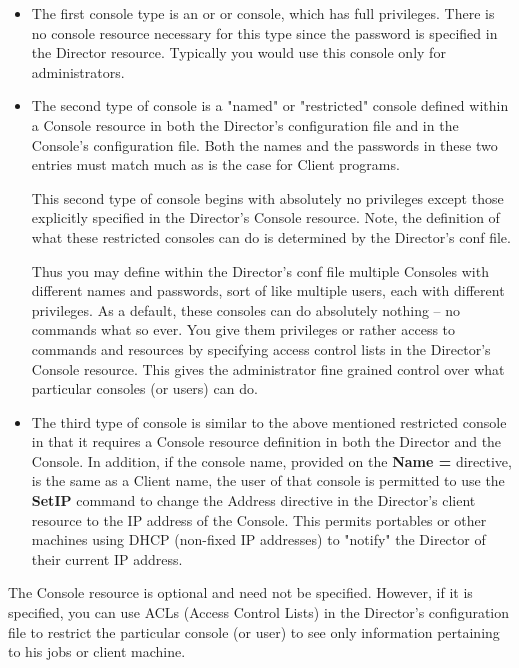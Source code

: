 \begin{itemize}
\item The first console type is an  or  or 
console, which has full privileges.  There is no console resource
necessary for this type since the password is specified in the Director
resource.  Typically you would use this console
only for administrators.

\item The second type of console is a
"named" or "restricted" console defined within a Console resource in
both the Director's configuration file and in the Console's
configuration file.  Both the names and the passwords in these two
entries must match much as is the case for Client programs.

This second type of console begins with absolutely no privileges except
those explicitly specified in the Director's Console resource.  Note,
the definition of what these restricted consoles can do is determined
by the Director's conf file.

Thus you may define within the Director's conf file multiple Consoles
with different names and passwords, sort of like multiple users, each
with different privileges.  As a default, these consoles can do
absolutely nothing -- no commands what so ever.  You give them
privileges or rather access to commands and resources by specifying
access control lists in the Director's Console resource.  This gives the
administrator fine grained control over what particular consoles (or
users) can do.

\item The third type of console is similar to the above mentioned
restricted console in that it requires a Console resource definition in
both the Director and the Console.  In addition, if the console name,
provided on the {\bf Name =} directive, is the same as a Client name,
the user of that console is permitted to use the {\bf SetIP} command to
change the Address directive in the Director's client resource to the IP
address of the Console.  This permits portables or other machines using
DHCP (non-fixed IP addresses) to "notify" the Director of their current
IP address.
\end{itemize}

The Console resource is optional and need not be specified. However, if it is
specified, you can use ACLs (Access Control Lists) in the Director's
configuration file to restrict the particular console (or user) to see only
information pertaining to his jobs or client machine.

